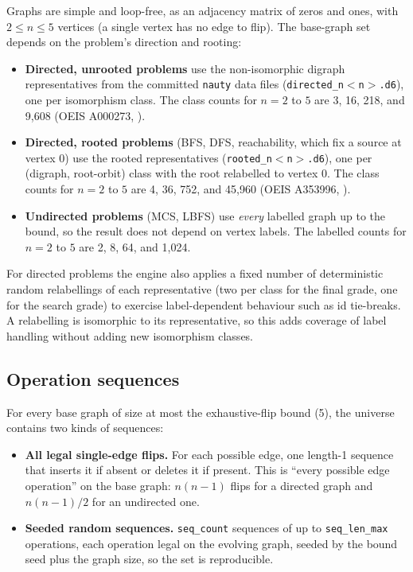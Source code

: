 Graphs are simple and loop-free, as an adjacency matrix of zeros and ones, with
$2 \le n \le 5$ vertices (a single vertex has no edge to flip). The base-graph set
depends on the problem's direction and rooting:

\begin{itemize}
  \item \textbf{Directed, unrooted problems} use the non-isomorphic digraph
  representatives from the committed \texttt{nauty} data files
  (\texttt{directed\_n$<$n$>$.d6}), one per isomorphism class. The class counts
  for $n = 2$ to $5$ are 3, 16, 218, and 9,608 (OEIS A000273, \citealp{oeisA000273}).
  \item \textbf{Directed, rooted problems} (BFS, DFS, reachability, which fix a
  source at vertex 0) use the rooted representatives
  (\texttt{rooted\_n$<$n$>$.d6}), one per (digraph, root-orbit) class with the
  root relabelled to vertex 0. The class counts for $n = 2$ to $5$ are 4, 36,
  752, and 45,960 (OEIS A353996, \citealp{oeisA353996}).
  \item \textbf{Undirected problems} (MCS, LBFS) use \emph{every} labelled graph
  up to the bound, so the result does not depend on vertex labels. The labelled
  counts for $n = 2$ to $5$ are 2, 8, 64, and 1,024.
\end{itemize}

For directed problems the engine also applies a fixed number of deterministic
random relabellings of each representative (two per class for the final grade, one
for the search grade) to exercise label-dependent behaviour such as id
tie-breaks. A relabelling is isomorphic to its representative, so this adds
coverage of label handling without adding new isomorphism classes.

\subsection{Operation sequences}

For every base graph of size at most the exhaustive-flip bound (5), the universe
contains two kinds of sequences:

\begin{itemize}
  \item \textbf{All legal single-edge flips.} For each possible edge, one
  length-1 sequence that inserts it if absent or deletes it if present. This is
  ``every possible edge operation'' on the base graph: $n(n-1)$ flips for a
  directed graph and $n(n-1)/2$ for an undirected one.
  \item \textbf{Seeded random sequences.} \texttt{seq\_count} sequences of up to
  \texttt{seq\_len\_max} operations, each operation legal on the evolving graph,
  seeded by the bound seed plus the graph size, so the set is reproducible.
\end{itemize}

